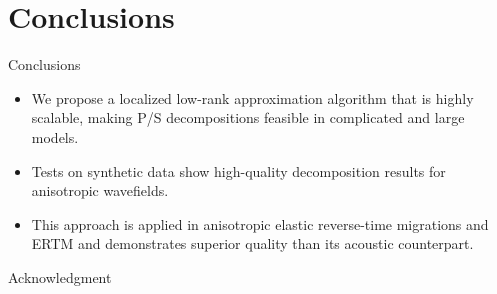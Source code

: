 \documentclass[aspectratio=169]{beamer}
\begin{document}
\section{Conclusions}
\begin{frame}{Conclusions}
\begin{itemize}
\item{We propose a localized low-rank approximation algorithm that is highly scalable, making P/S decompositions feasible in complicated and large models.
}
\item{
Tests on synthetic data show high-quality decomposition results for anisotropic wavefields.
}
\item{
This approach is applied in anisotropic elastic reverse-time migrations and ERTM and demonstrates superior quality than its acoustic counterpart.
}
\end{itemize}
\end{frame}
\begin{frame}{Acknowledgment}
\end{frame}


\end{document}
